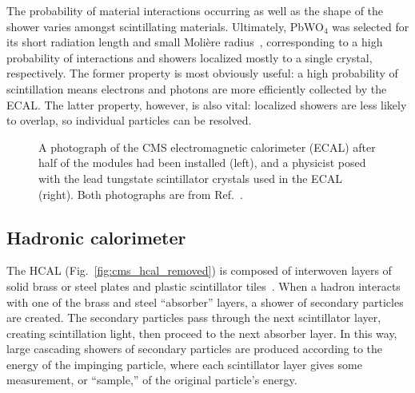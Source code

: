 The probability of material interactions occurring as well as the shape of the shower varies amongst scintillating materials. 
Ultimately, PbWO$_4$ was selected for its short radiation length and small Moli\`ere radius~\cite{CERN-LHCC-97-033}, corresponding to a high probability of interactions and showers localized mostly to a single crystal, respectively. 
The former property is most obviously useful: a high probability of scintillation means electrons and photons are more efficiently collected by the ECAL. 
The latter property, however, is also vital: localized showers are less likely to overlap, so individual particles can be resolved. 

\begin{figure}[htb]
    \centering
    \quad
    \caption[A photograph of the CMS electromagnetic calorimeter (ECAL) after half of the modules had been installed, and a physicist posed with the lead tungstate scintillator crystals used in the ECAL]{
        A photograph of the CMS electromagnetic calorimeter (ECAL) after half of the modules had been installed (left), and a physicist posed with the lead tungstate scintillator crystals used in the ECAL (right). 
        Both photographs are from Ref.~\cite{Brice:1431477}.
    }
    \label{fig:cms_ecal}
\end{figure}

\subsection{Hadronic calorimeter}
The HCAL (Fig.~\ref{fig:cms_hcal_removed}) is composed of interwoven layers of solid brass or steel plates and plastic scintillator tiles~\cite{CERN-LHCC-97-031}. 
When a hadron interacts with one of the brass and steel ``absorber'' layers, a shower of secondary particles are created. 
The secondary particles pass through the next scintillator layer, creating scintillation light, then proceed to the next absorber layer. 
In this way, large cascading showers of secondary particles are produced according to the energy of the impinging particle, where each scintillator layer gives some measurement, or ``sample,'' of the original particle's energy. 

